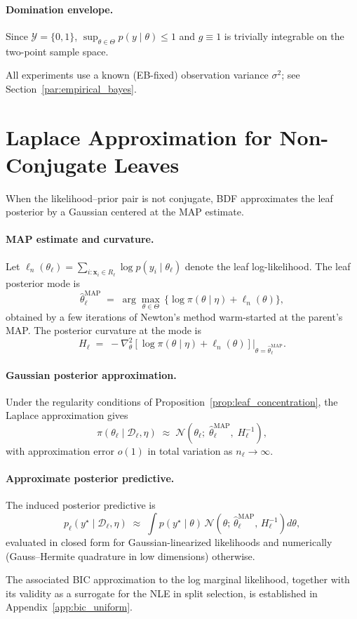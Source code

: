 \documentclass[twoside,11pt]{article}
\begin{document}
\paragraph{Domination envelope.} Since $\mathcal{Y}=\{0,1\}$, $\sup_{\theta\in\Theta}p(y\mid\theta)\le 1$ and $g\equiv 1$ is trivially integrable on the two-point sample space.

\begin{remark}
All experiments use a known (EB-fixed) observation variance $\sigma^2$;
see Section~\ref{par:empirical_bayes}.
\end{remark}

\section{Laplace Approximation for Non-Conjugate Leaves}
\label{app:approximate-bayesian-calculations-non-conjugate}

When the likelihood--prior pair is not conjugate, BDF approximates the
leaf posterior by a Gaussian centered at the MAP estimate.

\paragraph{MAP estimate and curvature.}
Let $\ell_n(\theta_\ell) = \sum_{i:\mathbf{x}_i\in R_\ell} \log p(y_i\mid\theta_\ell)$ denote the leaf log-likelihood. The leaf posterior mode is
\[
\hat{\theta}_\ell^{\mathrm{MAP}} \;=\; \arg\max_{\theta\in\Theta}\, \big\{\log \pi(\theta\mid\eta) + \ell_n(\theta)\big\},
\]
obtained by a few iterations of Newton's method warm-started at the parent's MAP. The posterior curvature at the mode is
\[
H_\ell \;=\; -\nabla_{\theta}^{2}\!\left[\log\pi(\theta\mid\eta) + \ell_n(\theta)\right]\!\big|_{\theta=\hat{\theta}_\ell^{\mathrm{MAP}}}.
\]

\paragraph{Gaussian posterior approximation.}
Under the regularity conditions of Proposition~\ref{prop:leaf_concentration}, the Laplace approximation gives
\[
\pi(\theta_\ell\mid\mathcal{D}_\ell,\eta) \;\approx\; \mathcal{N}\!\left(\theta_\ell;\; \hat{\theta}_\ell^{\mathrm{MAP}},\; H_\ell^{-1}\right),
\]
with approximation error $o(1)$ in total variation as $n_\ell\to\infty$.

\paragraph{Approximate posterior predictive.}
The induced posterior predictive is
\[
p_\ell(y^\star\mid \mathcal{D}_\ell,\eta) \;\approx\; \int p(y^\star\mid\theta)\,\mathcal{N}\!\left(\theta;\,\hat{\theta}_\ell^{\mathrm{MAP}},\, H_\ell^{-1}\right) d\theta,
\]
evaluated in closed form for Gaussian-linearized likelihoods and numerically (Gauss--Hermite quadrature in low dimensions) otherwise.

The associated BIC approximation to the log marginal likelihood, together with its validity as a surrogate for the NLE in split selection, is established in Appendix~\ref{app:bic_uniform}.






\end{document}
